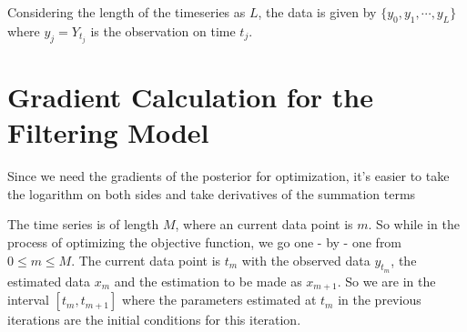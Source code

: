 \documentclass[a4paper,11pt]{article}
\begin{document}
Considering the length of the timeseries as $L$, the data is given by $\{ y_0, y_1, \cdots, y_L\}$ where $y_j = Y_{t_j}$ is the observation on time $t_j$.

\section{Gradient Calculation for the Filtering Model}


Since we need the gradients of the posterior for optimization, it's easier to take the logarithm on both sides and take derivatives of the summation terms


The time series is of length $M$, where an current data point is $m$. So while in the process of optimizing the objective function, we go one - by - one from $0 \leq m \leq M$. The current data point is $t_{m}$ with the observed data $y_{t_{m}}$, the estimated data $x_{m}$ and the estimation to be made as $x_{m+1}$. So we are in the interval $[t_{m}, t_{m+1}]$ where the parameters estimated at $t_{m}$ in the previous iterations are the initial conditions for this iteration. \\
\end{document}
